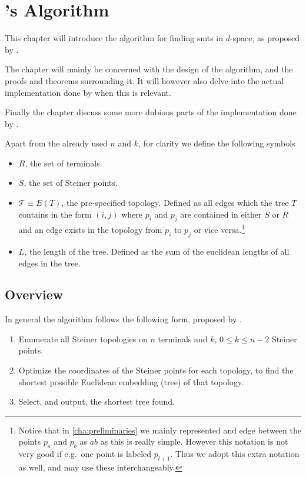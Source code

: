 { \abnormalparskip{0pt}
  \chapter{\citeauthor{smith1992}'s Algorithm}
  \label{cha:algorithm} }


This chapter will introduce the algorithm for finding \acp{smt} in
$d$-space, as proposed by \textcite{smith1992}.

The chapter will mainly be concerned with the design of the algorithm, and the
proofs and theorems surrounding it. It will however also delve into the actual
implementation done by \citeauthor{smith1992} when this is relevant.

Finally the chapter discuss some more dubious parts of the implementation done
by \citeauthor{smith1992}.

Apart from the already used $n$ and $k$, for clarity we define the following symbols
%
\begin{itemize}
\item $R$, the set of terminals.
\item $S$, the set of Steiner points.
\item $\mathcal{T} \equiv E(T)$, the pre-specified topology. Defined as all
  edges which the tree $T$ contains in the form $(i, j)$ where $p_i$ and
  $p_j$ are contained in either $S$ or $R$ and an edge exists in the
  topology from $p_i$ to $p_j$ or vice versa.\footnote{Notice that in
    \cref{cha:preliminaries} we mainly represented and edge between the points
    $p_a$ and $p_b$ as $ab$ as this is really simple. However this notation is not
    very good if e.g.\ one point is labeled $p_{l+1}$. Thus we adopt this extra
    notation as well, and may use these interchangeably.}
\item $L$, the length of the tree. Defined as the sum of the euclidean lengths
  of all edges in the tree.
\end{itemize}

\section{Overview}
\label{sec:overview}

In general the algorithm follows the following form, proposed by \textcite{gilbert1968}.

\begin{enumerate}
\item Enumerate all Steiner topologies on $n$ terminals and $k$, $0 \le k \le
  n-2$ Steiner points.
\item Optimize the coordinates of the Steiner points for each topology, to find
  the shortest possible Euclidean embedding (tree) of that topology.
\item Select, and output, the shortest tree found.
\end{enumerate}

